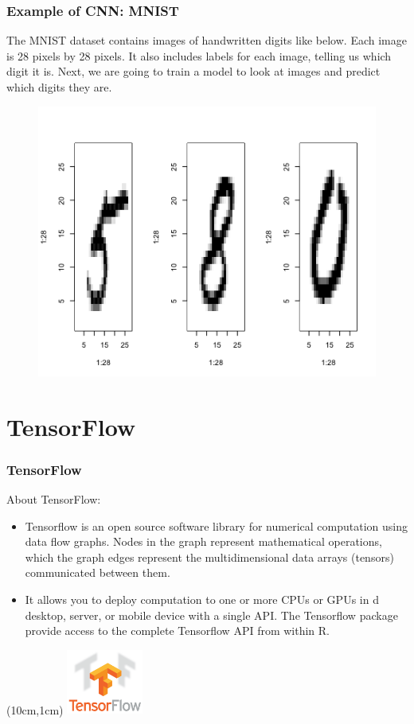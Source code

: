 \documentclass{beamer}
\begin{document}
\begin{frame}
	\frametitle{Example of CNN: MNIST}
	The MNIST dataset contains images of handwritten digits like below. Each image is 28 pixels by 28 pixels. It also includes labels for each image, telling us which digit it is. Next, we are going to train a model to look at images and predict which digits they are.
	\begin{figure}
		\includegraphics[width=0.9\linewidth, height=0.4\linewidth]{MNIST1}
	\end{figure}
\end{frame}

\section{TensorFlow}
\begin{frame}
	\frametitle{TensorFlow}
	
\vspace{0.5in}
About TensorFlow:
\begin{itemize}
	\item Tensorflow is an open source software library for numerical computation using data flow graphs. Nodes in the graph represent mathematical operations, which the graph edges represent the multidimensional data arrays (tensors) communicated between them. 
	\item It allows you to deploy computation to one or more CPUs or GPUs in d desktop, server, or mobile device with a single API. The Tensorflow package provide access to the complete Tensorflow API from within R. 
\end{itemize}
	\begin{textblock*}{5cm}(10cm,1cm) %
		\includegraphics[width=2.5cm]{tensorflow_logo}
	\end{textblock*}
\end{frame}
\end{document}
